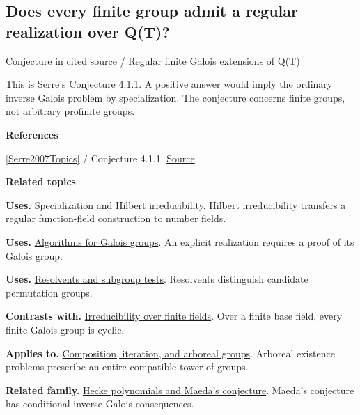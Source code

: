 \documentclass[11pt,a4paper,oneside,openany]{book}
\newenvironment{sources}{\par\smallskip\begingroup\footnotesize\color{atlasgray}\leftskip=10pt\setlength{\parskip}{2pt}}{\par\endgroup\smallskip}
\begin{document}
\subsection*{Does every finite group admit a regular realization over Q(T)?}
{\small\sffamily\color{atlasgold}Conjecture in cited source / Regular finite Galois extensions of Q(T)}\par\smallskip
\color{black} This is Serre's Conjecture 4.1.1. A positive answer would imply the ordinary inverse Galois problem by specialization. The conjecture concerns finite groups, not arbitrary profinite groups.\par
\begin{sources}
\textbf{References}\par\smallskip
\noindent\hyperlink{ref:Serre2007Topics}{[Serre2007Topics]} / Conjecture 4.1.1.  \href{https://www.routledge.com/Topics-in-Galois-Theory-2nd-Edition/Serre/p/book/9780429064401}{Source}.\par
\end{sources}\color{black}
\par\medskip\begingroup\footnotesize\setlength{\parskip}{1pt}\textbf{\sffamily\color{atlasgreen}Related topics}\par
\color{black}\textbf{Uses.} \hyperlink{article:specialization}{Specialization and Hilbert irreducibility}. Hilbert irreducibility transfers a regular function-field construction to number fields.\par
\color{black}\textbf{Uses.} \hyperlink{article:galois-computation}{Algorithms for Galois groups}. An explicit realization requires a proof of its Galois group.\par
\color{black}\textbf{Uses.} \hyperlink{article:resolvents}{Resolvents and subgroup tests}. Resolvents distinguish candidate permutation groups.\par
\color{black}\textbf{Contrasts with.} \hyperlink{article:finite-field-irreducibility}{Irreducibility over finite fields}. Over a finite base field, every finite Galois group is cyclic.\par
\color{black}\textbf{Applies to.} \hyperlink{article:composition-iteration}{Composition, iteration, and arboreal groups}. Arboreal existence problems prescribe an entire compatible tower of groups.\par
\color{black}\textbf{Related family.} \hyperlink{article:hecke-polynomials}{Hecke polynomials and Maeda's conjecture}. Maeda's conjecture has conditional inverse Galois consequences.\par
\endgroup
\end{document}
